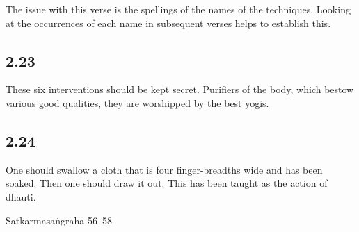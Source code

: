 \begin{ekdosis}
\begin{sources}[hp02_022]
\end{sources}

\begin{testimonia}[hp02_022]
\end{testimonia}

\begin{philcomm}[hp02_022]
The issue with this verse is the spellings of the names of the techniques. Looking at the occurrences of each name in subsequent verses helps to establish this.
\end{philcomm}

\subsection*{2.23}
\begin{translation}[hp02_023]
These six interventions should be kept secret. Purifiers of the body, which bestow various good qualities, they are worshipped by the best yogis.
\end{translation}

\begin{sources}[hp02_023]
\end{sources}

\begin{testimonia}[hp02_023]
\end{testimonia}

\begin{philcomm}[hp02_023]
\end{philcomm}

\subsection*{2.24}
\begin{translation}[hp02_024]
One should swallow a cloth that is four finger-breadths wide and has been soaked. Then one should draw it out. This has been taught as the action of dhauti.
\end{translation}

\begin{sources}[hp02_024]
\end{sources}

\begin{testimonia}[hp02_024]
Satkarmasaṅgraha 56–58


\end{testimonia}
\end{ekdosis}
